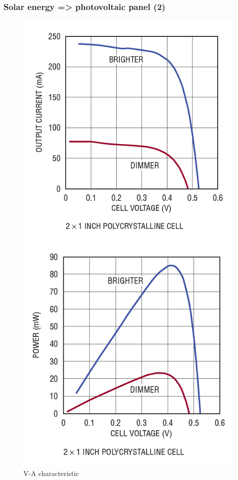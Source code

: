 \documentclass[12;pt,t]{beamer} %
\begin{document}
\begin{frame}
    \frametitle{Solar energy => photovoltaic panel (2)}
        \begin{figure}[h]
           	\begin{minipage}[b]{.42\textwidth}
           		\centering
           		\includegraphics[width=\textwidth]{img/photovoltaic-panel-AV-char.png}
                \caption{V-A characteristic}
           	\end{minipage}
           	\hfill
           	\begin{minipage}[b]{.42\textwidth}
           		\centering
           		\includegraphics[width=\textwidth]{img/photovoltaic-panel-WV-char.png}

\end{minipage}
\end{figure}
\end{frame}
\end{document}
